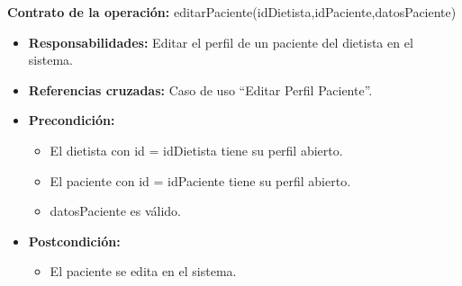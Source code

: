 \textbf{Contrato de la operación:} editarPaciente(idDietista,idPaciente,datosPaciente)
\begin{itemize}
\item \textbf{Responsabilidades:} Editar el perfil de un paciente del dietista en el sistema.
\item \textbf{Referencias cruzadas:} Caso de uso ``Editar Perfil Paciente''.
\item \textbf{Precondición:}
\begin{itemize}
\item El dietista con id = idDietista tiene su perfil abierto.
\item El paciente con id = idPaciente tiene su perfil abierto.
\item datosPaciente es válido.
\end{itemize}
\item \textbf{Postcondición:}
\begin{itemize}
\item El paciente se edita en el sistema.
\end{itemize}
\end{itemize}

